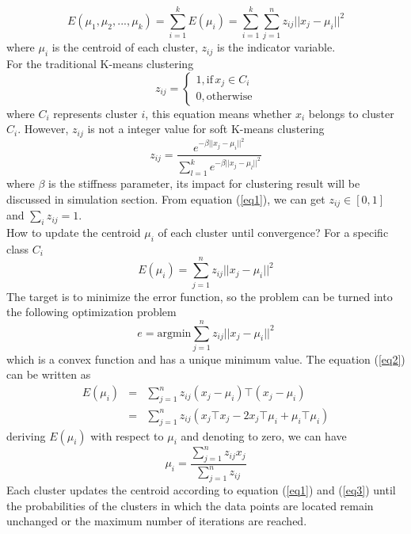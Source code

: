 \documentclass[11pt]{report}
\begin{document}
	\begin{equation}
	E\left(\mu_1,\mu_2,...,\mu_k\right) = \sum_{i=1}^{k}E\left(\mu_i\right) = \sum_{i=1}^{k}\sum_{j=1}^{n}z_{ij} ||x_j-\mu_i||^2
	\end{equation}
	where $\mu_i$ is the centroid of each cluster, $z_{ij}$ is the indicator variable. \\ 
	For the traditional K-means clustering 
	\begin{equation}
	z_{ij} = \left\{ \begin{array}{ll}
	1, \text{if}\,x_{j} \in C_{i}\\
	0, \text{otherwise}
	\end{array} \right.
	\end{equation}
	where $C_{i}$ represents cluster $i$, this equation means whether $x_{i}$ belongs to cluster $C_{i}$. However, $z_{ij}$ is not a integer value for soft K-means clustering 
	\begin{equation}
	\label{eq1}
	z_{ij} = \frac{e^{-\beta ||x_{j}-\mu_i||^2}}{\sum_{l=1}^{k}e^{-\beta||x_{j}-\mu_l||^2}}
	\end{equation}
	where $\beta$ is the stiffness parameter, its impact for clustering result will be discussed in simulation section. 
	From equation (\ref{eq1}), we can get $z_{ij} \in [0,1]$ and $\sum_{i}z_{ij}=1$.\\
	How to update the centroid $\mu_{i}$ of each cluster until convergence? For a specific class $C_{i}$
	\begin{equation}
	\label{eq2}
	E\left(\mu_{i}\right) = \sum_{j=1}^{n}z_{ij}||x_{j}-\mu_{i}||^2
	\end{equation}
	The target is to minimize the error function, so the problem can be turned into the following optimization problem
	\begin{equation}
	e = \text{argmin}\sum_{j=1}^{n}z_{ij}||x_{j}-\mu_{i}||^2
	\end{equation}
	which is a convex function and has a unique minimum value. The equation (\ref{eq2}) can be written as
	\begin{eqnarray}
	E\left(\mu_{i}\right) &=& \sum_{j=1}^{n}z_{ij}\left(x_j-\mu_{i}\right)\top \left(x_j-\mu_{i}\right)\\
	 &=& \sum_{j=1}^{n}z_{ij}\left(x_j \top x_j-2x_j \top \mu_{i} + \mu_{i} \top \mu_{i}\right)
	\end{eqnarray}
	deriving $E\left(\mu_{i}\right)$ with respect to $\mu_{i}$ and denoting to zero, we can have
	\begin{equation}
	\label{eq3}
	\mu_{i} = \frac{\sum_{j=1}^{n}z_{ij}x_j}{\sum_{j=1}^{n}z_{ij}}
	\end{equation}
	Each cluster updates the centroid according to equation (\ref{eq1}) and (\ref{eq3}) until the probabilities of the clusters in which the data points are located remain unchanged or the maximum number of iterations are reached. \\
\end{document}
